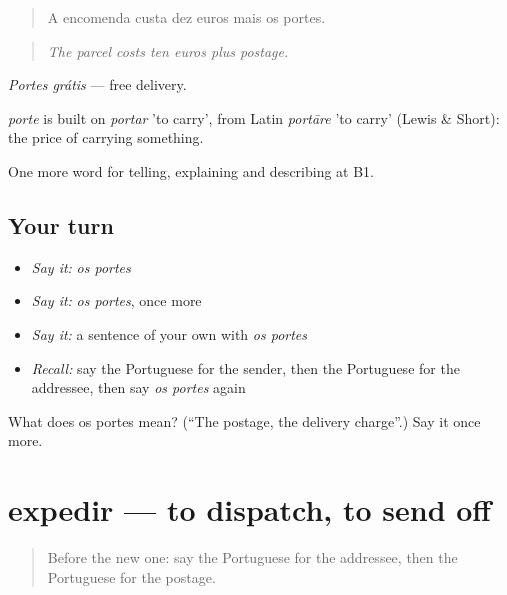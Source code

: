 \begin{quote}
A encomenda custa dez euros mais os portes.
\end{quote}

\begin{quote}
\emph{The parcel costs ten euros plus postage.}
\end{quote}

\emph{Portes grátis} — free delivery.

\begin{cousinweb}
\emph{porte} is built on \emph{portar} 'to carry', from Latin \emph{portāre} 'to carry' (Lewis \& Short): the price of carrying something.
\end{cousinweb}

\begin{grammarlens}[title={What you've built}]
One more word for telling, explaining and describing at B1.
\end{grammarlens}

\subsection*{Your turn}
\begin{itemize}
\raggedright
  \item \emph{Say it:} \emph{os portes}
  \item \emph{Say it:} \emph{os portes}, once more
  \item \emph{Say it:} a sentence of your own with \emph{os portes}
  \item \emph{Recall:} say the Portuguese for the sender, then the Portuguese for the addressee, then say \emph{os portes} again
\end{itemize}

\begin{tcolorbox}[breakable,colback=teal!4,colframe=teal!35!black,title={Before you move on}]
What does os portes mean? (\textquotedblleft{}The postage, the delivery charge\textquotedblright{}.) Say it once more.
\end{tcolorbox}
\section[expedir]{expedir — to dispatch, to send off}

\label{lesson:PT-C454-expedir}



\begin{quote}
Before the new one: say the Portuguese for the addressee, then the Portuguese for the postage.
\end{quote}

